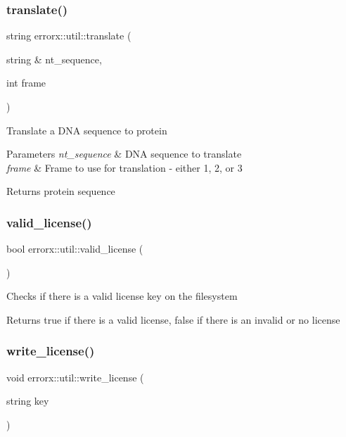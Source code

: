 \subsubsection{\texorpdfstring{translate()}{translate()}}
{\footnotesize\ttfamily string errorx\+::util\+::translate (\begin{DoxyParamCaption}\item[{string \&}]{nt\+\_\+sequence,  }\item[{int}]{frame }\end{DoxyParamCaption})}

Translate a D\+NA sequence to protein


\begin{DoxyParams}{Parameters}
{\em nt\+\_\+sequence} & D\+NA sequence to translate \\
\hline
{\em frame} & Frame to use for translation -\/ either 1, 2, or 3\\
\hline
\end{DoxyParams}
\begin{DoxyReturn}{Returns}
protein sequence 
\end{DoxyReturn}
\mbox{\label{util_8hh_file_a29c8c0c8338824b29298dc193d262559}} 
\subsubsection{\texorpdfstring{valid\+\_\+license()}{valid\_license()}}
{\footnotesize\ttfamily bool errorx\+::util\+::valid\+\_\+license (\begin{DoxyParamCaption}{ }\end{DoxyParamCaption})}

Checks if there is a valid license key on the filesystem

\begin{DoxyReturn}{Returns}
true if there is a valid license, false if there is an invalid or no license 
\end{DoxyReturn}
\mbox{\label{util_8hh_file_a308f4a9b717da32d1374d30bf049fe77}} 
\subsubsection{\texorpdfstring{write\+\_\+license()}{write\_license()}}
{\footnotesize\ttfamily void errorx\+::util\+::write\+\_\+license (\begin{DoxyParamCaption}\item[{string}]{key }\end{DoxyParamCaption})}

